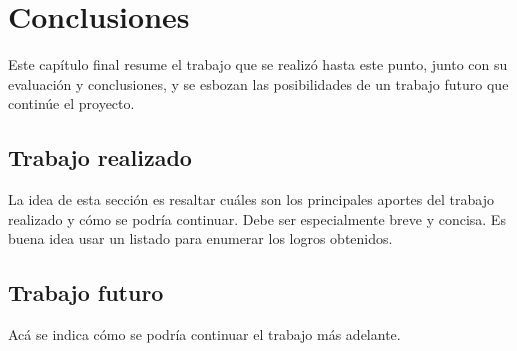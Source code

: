 
\chapter{Conclusiones} %

\label{Chapter5} %




Este capítulo final resume el trabajo que se realizó hasta este punto, junto con su evaluación y conclusiones, y se esbozan las posibilidades de un trabajo futuro que continúe el proyecto.

\section{Trabajo realizado}

La idea de esta sección es resaltar cuáles son los principales aportes del trabajo realizado y cómo se podría continuar. Debe ser especialmente breve y concisa. Es buena idea usar un listado para enumerar los logros obtenidos.

\section{Trabajo futuro}

Acá se indica cómo se podría continuar el trabajo más adelante.
